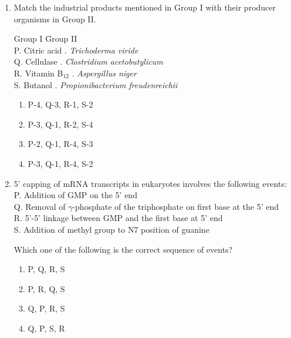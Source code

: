 \documentclass[journal,12pt,onecolumn]{IEEEtran}
\theoremstyle{remark}
\begin{document}
\begin{enumerate}
    What type of inheritance does the disease follow?
    \begin{multicols}{2}
    \begin{enumerate}
        \item Autosomal dominant
        \item X-linked dominant
        \item X-linked recessive
        \item Autosomal recessive
    \end{enumerate}
    \end{multicols}
    \item Match the industrial products mentioned in Group I with their producer organisms in Group II.

    \begin{tabbing}
    Group I \hspace{1.5cm} \= Group II \\
    P. Citric acid . \textit{Trichoderma viride} \\
    Q. Cellulase . \textit{Clostridium acetobutylicum} \\
    R. Vitamin B$_{12}$ . \textit{Aspergillus niger} \\
    S. Butanol . \textit{Propionibacterium freudenreichii}
    \end{tabbing}

    \begin{multicols}{2}
    \begin{enumerate}
        \item P-4, Q-3, R-1, S-2
        \item P-3, Q-1, R-2, S-4
        \item P-2, Q-1, R-4, S-3
        \item P-3, Q-1, R-4, S-2
    \end{enumerate}
    \end{multicols}

    \item 5' capping of mRNA transcripts in eukaryotes involves the following events:\\
    P. Addition of GMP on the 5' end\\
    Q. Removal of $\gamma$-phosphate of the triphosphate on first base at the 5' end\\
    R. 5'-5' linkage between GMP and the first base at 5' end\\
    S. Addition of methyl group to N7 position of guanine

    Which one of the following is the correct sequence of events?
    \begin{multicols}{2}
    \begin{enumerate}
        \item P, Q, R, S
        \item P, R, Q, S
        \item Q, P, R, S
        \item Q, P, S, R
    \end{enumerate}
    \end{multicols}


\end{enumerate}
\end{document}
